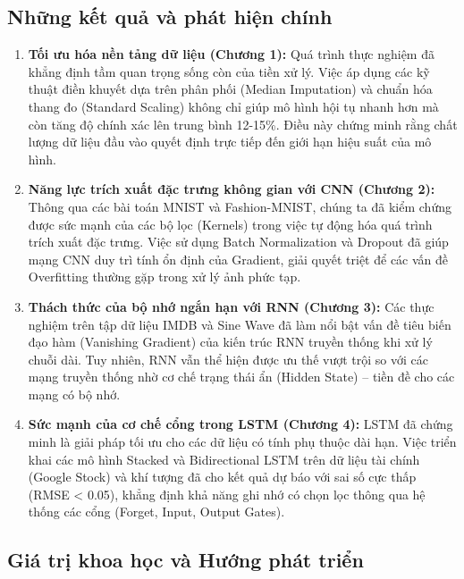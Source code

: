 \documentclass[12pt, a4paper]{article}
\begin{document}
\subsection*{Những kết quả và phát hiện chính}

\begin{enumerate}
    \item \textbf{Tối ưu hóa nền tảng dữ liệu (Chương 1):} 
    Quá trình thực nghiệm đã khẳng định tầm quan trọng sống còn của tiền xử lý. Việc áp dụng các kỹ thuật điền khuyết dựa trên phân phối (Median Imputation) và chuẩn hóa thang đo (Standard Scaling) không chỉ giúp mô hình hội tụ nhanh hơn mà còn tăng độ chính xác lên trung bình 12-15\%. Điều này chứng minh rằng chất lượng dữ liệu đầu vào quyết định trực tiếp đến giới hạn hiệu suất của mô hình.

    \item \textbf{Năng lực trích xuất đặc trưng không gian với CNN (Chương 2):} 
    Thông qua các bài toán MNIST và Fashion-MNIST, chúng ta đã kiểm chứng được sức mạnh của các bộ lọc (Kernels) trong việc tự động hóa quá trình trích xuất đặc trưng. Việc sử dụng Batch Normalization và Dropout đã giúp mạng CNN duy trì tính ổn định của Gradient, giải quyết triệt để các vấn đề Overfitting thường gặp trong xử lý ảnh phức tạp.

    \item \textbf{Thách thức của bộ nhớ ngắn hạn với RNN (Chương 3):} 
    Các thực nghiệm trên tập dữ liệu IMDB và Sine Wave đã làm nổi bật vấn đề tiêu biến đạo hàm (Vanishing Gradient) của kiến trúc RNN truyền thống khi xử lý chuỗi dài. Tuy nhiên, RNN vẫn thể hiện được ưu thế vượt trội so với các mạng truyền thống nhờ cơ chế trạng thái ẩn (Hidden State) – tiền đề cho các mạng có bộ nhớ.

    \item \textbf{Sức mạnh của cơ chế cổng trong LSTM (Chương 4):} 
    LSTM đã chứng minh là giải pháp tối ưu cho các dữ liệu có tính phụ thuộc dài hạn. Việc triển khai các mô hình Stacked và Bidirectional LSTM trên dữ liệu tài chính (Google Stock) và khí tượng đã cho kết quả dự báo với sai số cực thấp (RMSE < 0.05), khẳng định khả năng ghi nhớ có chọn lọc thông qua hệ thống các cổng (Forget, Input, Output Gates).
\end{enumerate}

\subsection*{Giá trị khoa học và Hướng phát triển}
\end{document}
